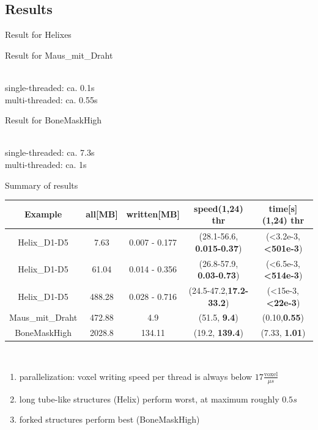 \documentclass{beamer}
\begin{document}
\subsection{Results}
\begin{frame}{Result for Helixes}
  \begin{adjustbox}{max totalsize={.9\textwidth}{.9\textheight},center}
    {}
  \end{adjustbox}
\end{frame}
\begin{frame}{Result for Maus\_mit\_Draht}
  \begin{adjustbox}{max totalsize={.9\textwidth}{.7\textheight},center}
    {}
  \end{adjustbox}\\
  single-threaded: ca. 0.1s\\
  multi-threaded: ca. 0.55s
\end{frame}
\begin{frame}{Result for BoneMaskHigh}
  \begin{adjustbox}{max totalsize={.9\textwidth}{.7\textheight},center}
    {}
  \end{adjustbox}\\
  single-threaded: ca. 7.3s\\
  multi-threaded: ca. 1s
\end{frame}
\begin{frame}{Summary of results}
  \centering
  {
    \scriptsize
  \begin{tabularx}{\textwidth}{@{}c@{}|@{}c@{}|@{}c@{}|@{}c@{}|@{}c@{}}
  \textbf{Example} & \textbf{all}[MB] & \textbf{written}[MB] &
    \textbf{speed}(1,\textbf{24}) thr & \textbf{time}[s](1,\textbf{24}) thr\\
  \hline
    Helix\_D1-D5 & 7.63 & 0.007 - 0.177 & (28.1-56.6, \textbf{0.015-0.37}) & (<3.2e-3,\textbf{<501e-3}) \\
    Helix\_D1-D5 & 61.04 & 0.014 - 0.356 & (26.8-57.9, \textbf{0.03-0.73}) & (<6.5e-3, \textbf{<514e-3}) \\
    Helix\_D1-D5 & 488.28 & 0.028 - 0.716 & (24.5-47.2,\textbf{17.2-33.2}) & (<15e-3,\textbf{<22e-3}) \\
    Maus\_mit\_Draht & 472.88 & 4.9 & (51.5, \textbf{9.4}) & (0.10,\textbf{0.55}) \\
    BoneMaskHigh & 2028.8 & 134.11 & (19.2, \textbf{139.4}) & (7.33, \textbf{1.01}) \\
  \end{tabularx}
  }
  \\
  \vspace{1cm}
  \begin{enumerate}
    \item parallelization: voxel writing speed per thread is always below $17 \frac{\text{voxel}}{\mu s}$
    \item long tube-like structures (Helix) perform worst, at maximum roughly $0.5s$
    \item forked structures perform best (BoneMaskHigh)
  \end{enumerate}
\end{frame}
\end{document}
